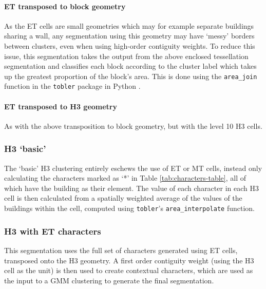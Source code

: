 \documentclass[a4paper, nobind]{templates/ociamthesis}
\begin{document}
\hypertarget{transposed-to-block-geometry}{%
\paragraph{ET transposed to block geometry}\label{transposed-to-block-geometry}}

As the ET cells are small geometries which may for example separate buildings sharing a wall, any segmentation using this geometry may have `messy' borders between clusters, even when using high-order contiguity weights. To reduce this issue, this segmentation takes the output from the above enclosed tessellation segmentation and classifies each block according to the cluster label which takes up the greatest proportion of the block's area. This is done using the \texttt{area\_join} function in the \texttt{tobler} package in Python \citep{knaap2021}.

\hypertarget{et-transposed-to-h3-geometry}{%
\paragraph{ET transposed to H3 geometry}\label{et-transposed-to-h3-geometry}}

As with the above transposition to block geometry, but with the level 10 H3 cells.

\hypertarget{h3-basic}{%
\subsubsection{H3 `basic'}\label{h3-basic}}

The `basic' H3 clustering entirely eschews the use of ET or MT cells, instead only calculating the characters marked as `*' in Table \ref{tab:characters-table}, all of which have the building as their element. The value of each character in each H3 cell is then calculated from a spatially weighted average of the values of the buildings within the cell, computed using \texttt{tobler}'s \texttt{area\_interpolate} function.

\hypertarget{h3-with-et-characters}{%
\subsubsection{H3 with ET characters}\label{h3-with-et-characters}}

This segmentation uses the full set of characters generated using ET cells, transposed onto the H3 geometry. A first order contiguity weight (using the H3 cell as the unit) is then used to create contextual characters, which are used as the input to a GMM clustering to generate the final segmentation.
\end{document}
